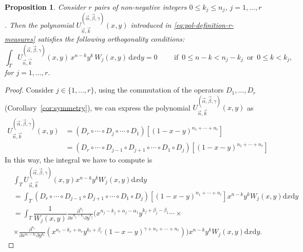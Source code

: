 \documentclass[11pt,reqno]{amsart}
\newcommand{\dr}{\mathrm{d}}
\newtheorem{proposition}[theorem]{Proposition}
\theoremstyle{definition}
\begin{document}
\begin{proposition}\label{propo:orthogonality}
    Consider $r$ pairs of non-negative integers $0\leq k_j\leq n_j$, $j=1,\dots,r$. Then the polynomial $U^{(\vec \alpha,\vec \beta,\gamma)}_{\vec n,\vec k}(x,y)$ introduced in \eqref{eq:pol-definition-r-measures} satisfies the following orthogonality conditions:
    \begin{equation}
        \label{eq:orthogonality-r-measures}
        \int_T U^{(\vec \alpha,\vec \beta,\gamma)}_{\vec n,\vec k}(x,y) \,x^{n-k}y^k \,W_j(x,y)\,\dr x\dr y=0 \qquad\text{ if } \, 0\leq n-k<n_j-k_j \, \text{ or } \, 0\leq k < k_j,
    \end{equation}
    for $j=1,\dots,r$.
\end{proposition}
\begin{proof}
    Consider $j\in\{1,\dots,r\}$, using the commutation of the operators $D_1,\dots,D_r$ (Corollary~\ref{cor:symmetry}), we can express the polynomial $U^{(\vec \alpha,\vec \beta,\gamma)}_{\vec n,\vec k}(x,y)$ as
    \begin{equation*}
        \begin{aligned}
            U^{(\vec \alpha,\vec \beta,\gamma)}_{\vec n,\vec k}(x,y) &= (D_r\circ\cdots\circ D_j\circ \cdots \circ D_1)[(1-x-y)^{n_1+\cdots+n_r}]\\ &=(D_r\circ\cdots\circ D_{j-1}\circ D_{j+1}\circ \cdots \circ D_1\circ D_j)[(1-x-y)^{n_1+\cdots+n_r}]
        \end{aligned}
    \end{equation*}     
    In this way, the integral we have to compute is
    \begin{equation*}
        \begin{aligned}
    & \int_T U^{(\vec \alpha,\vec \beta,\gamma)}_{\vec n,\vec k}(x,y) x^{n-k}y^k W_j(x,y)\dr x\dr y \\ &=\int_T (D_r\circ\cdots\circ D_{j-1}\circ D_{j+1}\circ \cdots \circ D_1\circ D_j)[(1-x-y)^{n_1+\cdots+n_r}]x^{n-k}y^k W_j(x,y)\dr x\dr y 
    \\ &=
    \int_T \dfrac{1}{W_j(x,y)}\frac{\partial^{n_j}}{\partial x^{n_j-k_j}\partial y^{k_j}}\Big(x^{n_j-k_j+\alpha_j-\alpha_{1}}y^{k_{j}+\beta_j-\beta_{1}}  \cdots \times \\ &\times \frac{\partial^{n_r}}{\partial x^{n_r-k_r}\partial y^{k_r}}(x^{n_r-k_r+\alpha_r}y^{k_r+\beta_r}(1-x-y)^{\gamma+n_1+\cdots+n_r})\Big) x^{n-k}y^k W_j(x,y)\dr x \dr y.
    \end{aligned}
    \end{equation*}

\end{proof}
\end{document}
